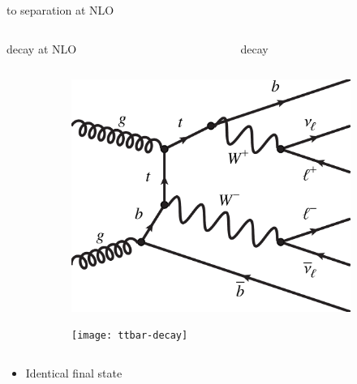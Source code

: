 \begin{frame}{\tW to \ttbar separation at NLO}
\begin{columns}
\quad
    \begin{column}{0.45\textwidth}
    \begin{block}{\tW decay at NLO}
    \end{block}
    \end{column}
    \quad
    \begin{column}{0.45\textwidth}
    \begin{block}{\ttbar decay}
    \end{block}
    \end{column}
\quad
\end{columns}
    \begin{figure}[htbp]
    \centering
    \begin{subfigure}[b]{0.44\textwidth}
        \includegraphics[width=\textwidth]{feynman_diagrams/tw-NLO.pdf}
        \label{fig:nlo:ttbar}
    \end{subfigure}
\quad
    \begin{subfigure}[b]{0.44\textwidth}
        \texttt{[image: ttbar-decay]}
        \label{fig:nlo:tw}
    \end{subfigure}
\end{figure}
%
\begin{columns}
\quad
    \begin{column}{0.45\textwidth}
\begin{itemize}
\item Identical final state

\end{itemize}
\end{column}
\end{columns}
\end{frame}
